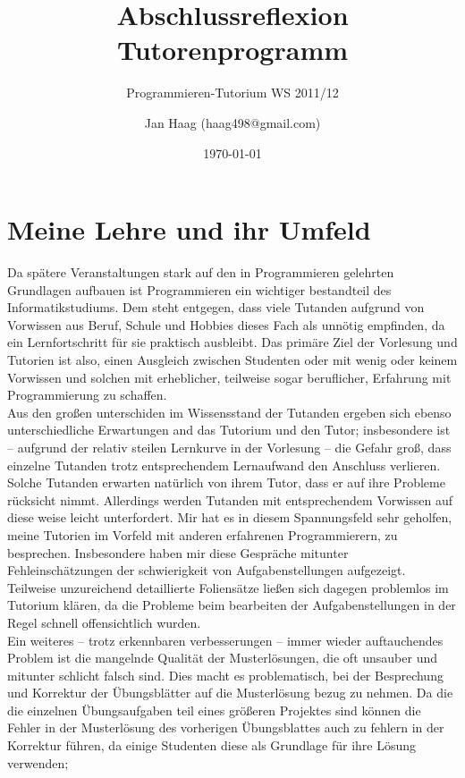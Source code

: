 \documentclass[%
fontsize=12pt,
paper=a4,
oneside,
DIV=11,
BCOR=0cm,
pagesize=automedia,
parskip=false,
headings=normal,
titlepage=true%
]{scrartcl}
\author{Jan Haag (haag498@gmail.com)}
\title{Abschlussreflexion Tutorenprogramm}
\subtitle{Programmieren-Tutorium WS 2011/12}
\date{\today}
\begin{document}
\maketitle
\section{Meine Lehre und ihr Umfeld}
Da sp\"{a}tere Veranstaltungen stark auf den in Programmieren gelehrten Grundlagen aufbauen
ist Programmieren ein wichtiger bestandteil des Informatikstudiums.
Dem steht entgegen, dass viele Tutanden aufgrund von Vorwissen
aus Beruf, Schule und Hobbies dieses Fach als unn\"{o}tig empfinden,
da ein Lernfortschritt f\"{u}r sie praktisch ausbleibt.
Das prim\"{a}re Ziel der Vorlesung und Tutorien ist also,
einen Ausgleich zwischen Studenten oder mit wenig oder keinem Vorwissen und solchen mit erheblicher,
teilweise sogar beruflicher, Erfahrung mit Programmierung zu schaffen.\\
Aus den gro\ss{}en unterschiden im Wissensstand der Tutanden ergeben sich ebenso unterschiedliche
Erwartungen and das Tutorium und den Tutor; insbesondere ist -- aufgrund der relativ steilen Lernkurve in
der Vorlesung -- die Gefahr gro\ss{}, dass einzelne Tutanden trotz entsprechendem Lernaufwand den Anschluss
verlieren. Solche Tutanden erwarten nat\"{u}rlich von ihrem Tutor, dass er auf ihre Probleme r\"{u}cksicht
nimmt. Allerdings werden Tutanden mit entsprechendem Vorwissen auf diese weise leicht unterfordert.
Mir hat es in diesem Spannungsfeld sehr geholfen, meine Tutorien im Vorfeld mit anderen erfahrenen Programmierern,
zu besprechen. Insbesondere haben mir diese Gespr\"{a}che mitunter Fehleinsch\"{a}tzungen der schwierigkeit von
Aufgabenstellungen aufgezeigt. Teilweise unzureichend detaillierte Foliens\"{a}tze lie\ss{}en sich dagegen problemlos
im Tutorium kl\"{a}ren, da die Probleme beim bearbeiten der Aufgabenstellungen in der Regel schnell offensichtlich
wurden.\\
Ein weiteres -- trotz erkennbaren verbesserungen --
immer wieder auftauchendes Problem ist die mangelnde Qualit\"{a}t der Musterl\"{o}sungen, die oft
unsauber und mitunter schlicht falsch sind. Dies macht es problematisch, bei der Besprechung und Korrektur
der \"{U}bungsbl\"{a}tter auf die Musterl\"{o}sung bezug zu nehmen. Da die die einzelnen \"{U}bungsaufgaben
teil eines gr\"{o}\ss{}eren Projektes sind k\"{o}nnen die Fehler in der Musterl\"{o}sung des vorherigen \"{U}bungsblattes
auch zu fehlern in der Korrektur f\"{u}hren, da einige Studenten diese als Grundlage f\"{u}r ihre L\"{o}sung verwenden;
\end{document}
